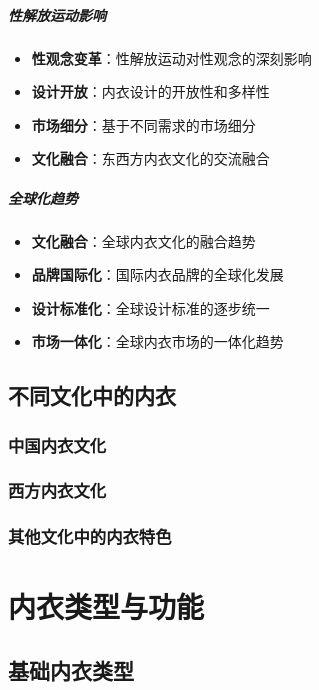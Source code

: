 \documentclass[12pt,UTF8]{ctexbook}
\begin{document}
\subsubsection{性解放运动影响}
\begin{itemize}[leftmargin=2cm]
	\item \textbf{性观念变革}：性解放运动对性观念的深刻影响
	\item \textbf{设计开放}：内衣设计的开放性和多样性
	\item \textbf{市场细分}：基于不同需求的市场细分
	\item \textbf{文化融合}：东西方内衣文化的交流融合
\end{itemize}

\subsubsection{全球化趋势}
\begin{itemize}[leftmargin=2cm]
	\item \textbf{文化融合}：全球内衣文化的融合趋势
	\item \textbf{品牌国际化}：国际内衣品牌的全球化发展
	\item \textbf{设计标准化}：全球设计标准的逐步统一
	\item \textbf{市场一体化}：全球内衣市场的一体化趋势
\end{itemize}

\chapter{不同文化中的内衣}
\section{中国内衣文化}
\section{西方内衣文化}
\section{其他文化中的内衣特色}

\part{内衣类型与功能}

\chapter{基础内衣类型}
\end{document}
